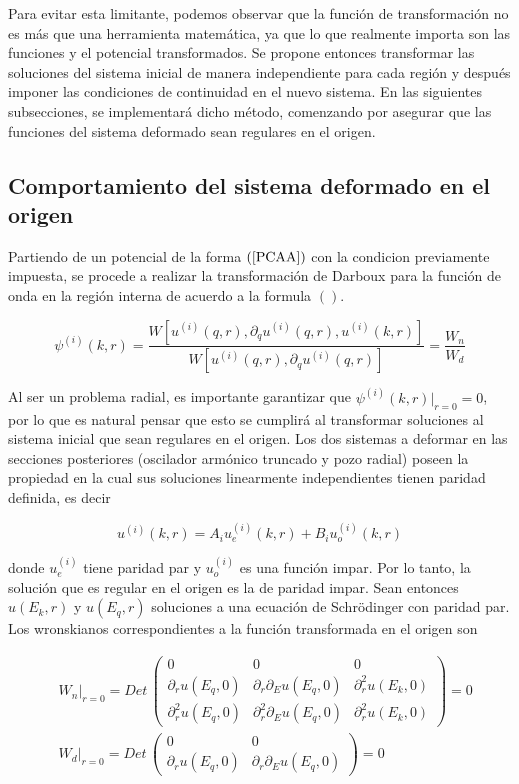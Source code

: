 Para evitar esta limitante, podemos observar que la función de transformación no es más que una herramienta matemática, ya que lo que realmente importa son las funciones y el potencial transformados. Se propone entonces transformar las soluciones del sistema inicial de manera independiente para cada región y después imponer las condiciones de continuidad en el nuevo sistema. En las siguientes subsecciones, se implementará dicho método, comenzando por asegurar que las funciones del sistema deformado sean regulares en el origen. 

\subsection{Comportamiento del sistema deformado en el origen}

Partiendo de un potencial de la forma $(\ref{PCAA})$ con la condicion previamente impuesta, se procede a realizar la transformación de Darboux para la función de onda en la región interna de acuerdo a la formula $()$. 

\begin{equation}
\psi^{(i)}(k,r) = \frac{W[u^{(i)}(q,r),\partial_q u^{(i)}(q,r),u^{(i)}(k,r)]}{W[u^{(i)}(q,r),\partial_q u^{(i)}(q,r)]} = \frac{W_n}{W_d}  \label{FITF}
\end{equation}

Al ser un problema radial, es importante garantizar que $\psi^{(i)}(k,r)|_{r=0}=0$, por lo que es natural pensar que esto se cumplirá al transformar soluciones al sistema inicial que sean regulares en el origen. Los dos sistemas a deformar en las secciones posteriores (oscilador armónico truncado y pozo radial) poseen la propiedad en la cual sus soluciones linearmente independientes tienen paridad definida, es decir

\begin{equation}
u^{(i)}(k,r) = A_i u^{(i)}_e (k,r) + B_i u^{(i)}_o (k,r)\label{FGSPD}
\end{equation}

donde $u^{(i)}_e$ tiene paridad par y $u^{(i)}_o$ es una función impar. Por lo tanto, la solución que es regular en el origen es la de paridad impar. Sean entonces  $u(E_k,r)$ y $u(E_q,r)$  soluciones a una ecuación de Schrödinger con paridad par. Los wronskianos correspondientes a la función transformada en el origen son


\begin{eqnarray*}
& W_n |_{r=0}= Det\, 
\begin{pmatrix}
0 & 0 & 0
\\
\partial_r u(E_q,0) & \partial_r \partial_E u(E_q,0) & \partial^2_r u(E_k,0)
\\
\partial^2_r u(E_q,0) & \partial^2_r \partial_E u(E_q,0) & \partial^2_r u(E_k,0)

\end{pmatrix} = 0
\\[0.4cm]
& W_d |_{r=0}= Det\, 
\begin{pmatrix}
0 & 0
\\
\partial_r u(E_q,0) & \partial_r \partial_E u(E_q,0)
\end{pmatrix} = 0
\end{eqnarray*}


